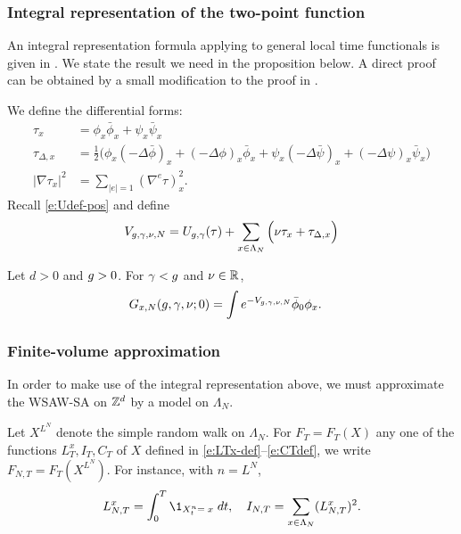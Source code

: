 \subsubsection{Integral representation of the two-point function}
\label{sec:Gintrep}

An integral representation formula applying to general local time functionals
is given in \cite{BEI92,BIS09}. We state the result we need in the proposition below.
A direct proof can be obtained by a small modification to the proof in
\cite[Appendix~A]{ST-phi4}.

We define the differential forms:
\begin{align}
\label{e:taudef}
\tau_x
	&=
\phi_x \bar\phi_x + \psi_x \bar\psi_x
	\\
\label{e:addDelta}
\tau_{\Delta,x}
	&=
\frac 12
\Big(
	\phi_{x} (- \Delta \bar{\phi})_{x} + (- \Delta \phi)_{x} \bar{\phi}_{x}
		+
	\psi_{x}  (- \Delta \bar{\psi})_{x} + (- \Delta \psi)_{x}  \bar{\psi}_{x}
\Big)
	\\
\label{e:nablatau}
|\nabla \tau_x|^2
	&=
\sum_{|e|=1} (\nabla^e \tau)_x^2.
\end{align}
Recall \eqref{e:Udef-pos} and define
\begin{equation}
\label{e:Vdef2}
V_{g,\gamma,\nu,N}
	=
U_{g,\gamma}(\tau)
	+
\sum_{x\in\Lambda_N}
\Big(
	\nu \tau_x + \tau_{\Delta,x}
\Big)
\end{equation}

\begin{prop}
Let $d > 0$ and $g > 0$. For $\gamma < g$ and $\nu \in {\mathbb R}$,
\begin{align}
\label{e:Grep-pos-bis}
G_{x,N}(g, \gamma, \nu; 0)
	&=
\int e^{-V_{g,\gamma,\nu,N}} \bar\phi_0 \phi_x.
\end{align}
\end{prop}

\subsubsection{Finite-volume approximation}

In order to make use of the integral representation above, we must approximate the
WSAW-SA on ${ {{\mathbb Z}}^d }$ by a model on $\Lambda_N$.

Let $X^{L^N}$ denote the simple random walk on $\Lambda_N$.
For $F_T = F_T(X)$ any one of the functions $L_T^x,I_T,C_T$
of $X$ defined in \eqref{e:LTx-def}--\eqref{e:CTdef},
we write $F_{N,T} = F_T(X^{L^N})$. For instance, with $n=L^N$,
\begin{equation}
    L^x_{N,T} = \int_0^T \1_{X^{n}_t=\;x} \; dt,
    \quad I_{N,T} = \sum_{x \in \Lambda_N}(L_{N,T}^x)^2 .
\end{equation}

